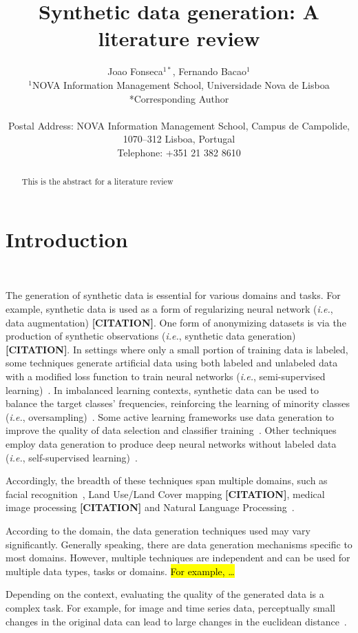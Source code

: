 \documentclass[parskip=full]{scrartcl}
\title{Synthetic data generation: A literature review}
\author{%
	Joao Fonseca\(^{1*}\), Fernando Bacao\(^{1}\)
	\\
	\small{\(^{1}\)NOVA Information Management School, Universidade Nova de Lisboa}
	\\
	\small{*Corresponding Author}
	\\
	\\
	\small{Postal Address: NOVA Information Management School, Campus de
    Campolide, 1070--312 Lisboa, Portugal}
	\\
	\small{Telephone: +351 21 382 8610}
}
\date{}
\begin{document}
\maketitle

\begin{abstract}

    This is the abstract for a literature review

\end{abstract}

\section{Introduction}~\label{sec:introduction}

The generation of synthetic data is essential for various domains and tasks.
For example, synthetic data is used as a form of regularizing neural network
(\textit{i.e.}, data augmentation) \textbf{[CITATION]}. One form of
anonymizing datasets is via the production of synthetic observations
(\textit{i.e.}, synthetic data generation) \textbf{[CITATION]}. In settings
where only a small portion of training data is labeled, some techniques
generate artificial data using both labeled and unlabeled data with a modified
loss function to train neural networks (\textit{i.e.}, semi-supervised
learning)~\cite{laine2017temporal}. In imbalanced learning contexts, synthetic
data can be used to balance the target classes' frequencies, reinforcing the
learning of minority classes (\textit{i.e.},
oversampling)~\cite{fonseca2021improving}. Some active learning frameworks use
data generation to improve the quality of data selection and classifier
training~\cite{kim2021lada}. Other techniques employ data generation to
produce deep neural networks without labeled data (\textit{i.e.},
self-supervised learning)~\cite{grill2020bootstrap}.

Accordingly, the breadth of these techniques span multiple domains, such as
facial recognition~\cite{lv2017data}, Land Use/Land Cover mapping
\textbf{[CITATION]}, medical image processing \textbf{[CITATION]} and Natural
Language Processing~\cite{feng2021survey}. 

According to the domain, the data generation techniques used may vary
significantly. Generally speaking, there are data generation mechanisms
specific to most domains. However, multiple techniques are independent and can
be used for multiple data types, tasks or domains. \hl{For example, \ldots}

Depending on the context, evaluating the quality of the generated data is a
complex task. For example, for image and time series data, perceptually small
changes in the original data can lead to large changes in the euclidean
distance~\cite{assefa2020generating, theis2016note}.
\end{document}
